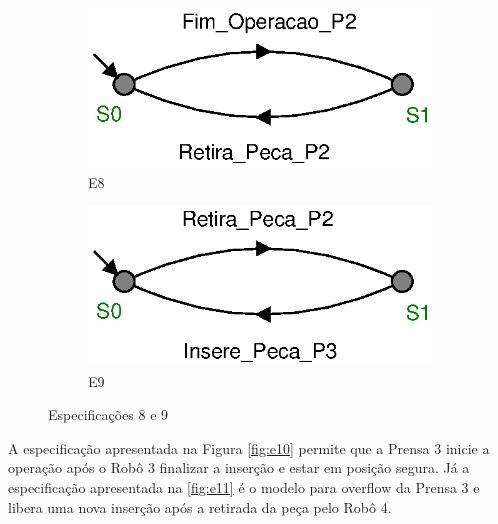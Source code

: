\begin{figure}[H]%
  \centering
  \begin{subfigure}{0.45\textwidth}
      \centering
      \includegraphics[width=\textwidth]{imagens/E8.eps}
      \caption{E8}
      \label{fig:e8}
  \end{subfigure}
  \hfill
  \begin{subfigure}{0.45\textwidth}
      \centering
      \includegraphics[width=\textwidth]{imagens/E9.eps}
      \caption{E9}
      \label{fig:e9}
  \end{subfigure}
  \caption{Especificações 8 e 9}
  \label{fig:e89}
\end{figure}

A especificação apresentada na Figura \ref{fig:e10} permite que a Prensa 3 inicie a operação após o Robô 3 finalizar a inserção e estar em posição segura.
Já a especificação apresentada na \ref{fig:e11} é o modelo para overflow da Prensa 3 e libera uma nova inserção após a retirada da peça pelo Robô 4.

